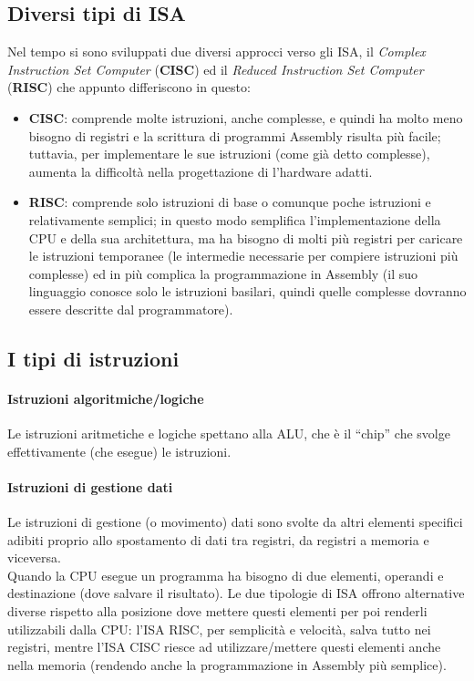 \documentclass[class=book, crop=false]{standalone}
\begin{document}
\subsection{Diversi tipi di ISA}
Nel tempo si sono sviluppati due diversi approcci verso  gli ISA, il \emph{Complex Instruction Set Computer} (\textbf{CISC}) ed il \emph{Reduced Instruction Set Computer} (\textbf{RISC}) che appunto differiscono in questo:
\begin{itemize}[noitemsep]
	\item \textbf{CISC}: comprende molte istruzioni, anche complesse, e quindi ha molto meno bisogno di registri e la scrittura di programmi Assembly risulta più facile; tuttavia, per implementare le sue istruzioni (come già detto complesse), aumenta la difficoltà nella progettazione di l’hardware adatti.
	\item \textbf{RISC}: comprende solo istruzioni di base o comunque poche istruzioni e relativamente semplici; in questo modo semplifica l’implementazione della CPU e della sua architettura, ma ha bisogno di molti più registri per caricare le istruzioni temporanee (le intermedie necessarie per compiere istruzioni più complesse) ed in più complica la programmazione in Assembly (il suo linguaggio conosce solo le istruzioni basilari, quindi quelle complesse dovranno essere descritte dal programmatore).
\end{itemize}

\subsection{I tipi di istruzioni}
\paragraph*{Istruzioni algoritmiche/logiche}
Le istruzioni aritmetiche e logiche spettano alla ALU, che è il “chip” che svolge effettivamente (che esegue) le istruzioni.
\paragraph*{Istruzioni di gestione dati}
Le istruzioni di gestione (o movimento) dati sono svolte da altri elementi specifici adibiti proprio allo spostamento di dati tra registri, da registri a memoria  e viceversa.\\
Quando la CPU esegue un programma ha bisogno di due elementi, operandi e destinazione (dove salvare il risultato).  Le due tipologie di ISA offrono alternative diverse rispetto alla posizione dove mettere questi elementi per poi renderli utilizzabili dalla CPU: l’ISA RISC, per semplicità  e velocità, salva tutto nei registri, mentre l’ISA CISC riesce ad utilizzare/mettere questi elementi anche nella memoria (rendendo anche la programmazione in Assembly più semplice).
\end{document}
